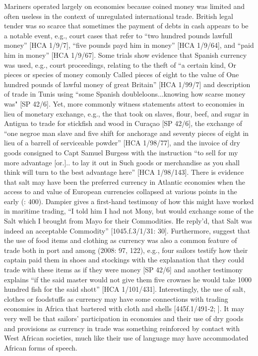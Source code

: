 Mariners operated largely on  economies because coined money was limited and often useless in the context of unregulated international trade. British legal tender was so scarce that sometimes the payment of debts in cash appears to be a notable event, e.g., court cases that refer to “two hundred pounds lawfull money” [HCA 1/9/7], “five pounds payd him in money” [HCA 1/9/64], and “paid him in money” [HCA 1/9/67]. Some trials show evidence that Spanish currency was used, e.g., court proceedings, relating to the theft of “a certain kind, Or pieces or species of money comonly Called pieces of eight to the value of One hundred pounds of lawful money of great Britain” [HCA 1/99/7] and description of trade in Tunis using “some Spanish doubleloons...knowing how scarse money was" [SP 42/6]. Yet, more commonly witness statements attest to  economies in lieu of monetary exchange, e.g., the  that took on slaves, flour, beef, and sugar in Antigua to trade for stickfish and wood in Curaçao [SP 42/6], the exchange of “one negroe man slave and five shift for anchorage and seventy pieces of eight in lieu of a barrell of serviceable powder” [HCA 1/98/77], and the invoice of dry goods consigned to Capt Samuel Burgess with the instruction “to sell for my more advantage [or.].. to lay it out in Such goods or merchandise as you shall think will turn to the best advantage here” [HCA 1/98/143]. There is evidence that salt may have been the preferred currency in Atlantic  economies when the access to and value of European currencies collapsed at various points in the early  (\citealt{Jarvis2010}: 400). Dampier gives a first-hand testimony of how this might have worked in maritime trading, “I told him I had not Mony, but would exchange some of the Salt which I brought from Mayo for their Commodities. He reply’d, that Salt was indeed an acceptable Commodity” [1045.f.3/1/31: 30]. Furthermore, \citeauthor{AdkinsAdkins2008} suggest that the use of food items and clothing as currency was also a common feature of trade both in port and among  (2008: 97, 122), e.g., four sailors testify how their captain paid them in shoes and stockings with the explanation that they could trade with these items as if they were money [SP 42/6] and another testimony explains “if the said master would not give them five crownes he would take 1000 hundred fish for the said shott” [HCA 1/101/431]. Interestingly, the use of salt, clothes or foodstuffs as currency may have some connections with trading economies in Africa that bartered with cloth and shells [445f.1/491-2; \citealt{HogendornJohnson2003}]. It may very well be that sailors’ participation in  economies and their use of dry goods and provisions as currency in trade was something reinforced by contact with West African societies, much like their use of language may have accommodated African forms of speech. 

